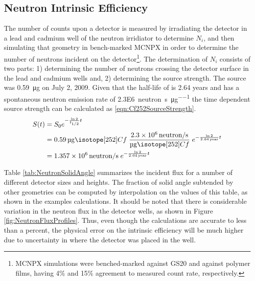 \documentclass[draftcls,onecolumn]{IEEEtran}
\begin{document}
\subsection{Neutron Intrinsic Efficiency}
The number of counts upon a detector is measured by irradiating the detector in a lead and cadmium well of the neutron irridiator to determine $N_i$, and then simulating that geometry in bench-marked MCNPX in order to determine the number of neutrons incident on the detector\footnote{MCNPX simulations were benched-marked against GS20 and against polymer films, having 4\% and 15\% agreement to measured count rate, respectively.}.
The determination of $N_i$ consists of two parts: 1) determining the number of neutrons crossing the detector surface in the lead and cadmium wells and, 2) determining the source strength.
The  source was \SI{0.59}{\ug} on July 2, 2009.
Given that the half-life of  is 2.64 years and  has a spontaneous neutron emission rate of \SI{2.3E6}{neutron\per\second\per\micro\gram} the time dependent source strength can be calculated as \eqref{eqn:Cf252SourceStrength}.
\begin{align}
  \label{eqn:Cf252SourceStrength}
  S(t) &= S_0 e^{-\frac{\ln{2}}{t_{1/2}} t} \\ \notag 
    &= \SI{0.59}{\ug} \iso[252]{Cf} \;\frac{\SI{2.3E6}{neutron\per\second}}{\si{\ug} \iso[252]{Cf}}\; e^{-\frac{ \ln{2}}{\SI{2.64}{year}}t}  \\ \notag
    &= \SI{1.357E6}{neutron\per\second}\; e^{-\frac{ \ln{2}}{\SI{2.64}{year}}t} 
\end{align}

Table \ref{tab:NeutronSolidAngle} summarizes the incident flux for a number of different detector sizes and heights.
The fraction of solid angle subtended by other geometries can be computed by interpolation on the values of this table, as shown in the examples calculations.
It should be noted that there is considerable variation in the neutron flux in the detector wells, as shown in Figure \ref{fig:NeutronFluxProfiles}.
Thus, even though the calculations are accurate to less than a percent, the physical error on the intrinsic efficiency will be much higher due to uncertainty in where the detector was placed in the well.
\end{document}
